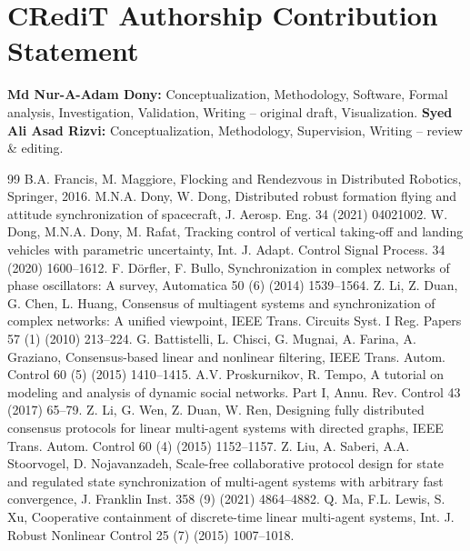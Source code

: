 \documentclass[12pt]{elsarticle}
\theoremstyle{remark}
\begin{document}
\section*{CRediT Authorship Contribution Statement}
\textbf{Md Nur-A-Adam Dony:} Conceptualization, Methodology, Software, Formal analysis, Investigation, Validation, Writing -- original draft, Visualization.
\textbf{Syed Ali Asad Rizvi:} Conceptualization, Methodology, Supervision, Writing -- review \& editing.
\begin{thebibliography}{99}
B.A. Francis, M. Maggiore, Flocking and Rendezvous in Distributed Robotics, Springer, 2016.
M.N.A. Dony, W. Dong, Distributed robust formation flying and attitude synchronization of spacecraft, J. Aerosp. Eng. 34 (2021) 04021002.
W. Dong, M.N.A. Dony, M. Rafat, Tracking control of vertical taking-off and landing vehicles with parametric uncertainty, Int. J. Adapt. Control Signal Process. 34 (2020) 1600--1612.
F. D\"{o}rfler, F. Bullo, Synchronization in complex networks of phase oscillators: A survey, Automatica 50 (6) (2014) 1539--1564.
Z. Li, Z. Duan, G. Chen, L. Huang, Consensus of multiagent systems and synchronization of complex networks: A unified viewpoint, IEEE Trans. Circuits Syst. I Reg. Papers 57 (1) (2010) 213--224.
G. Battistelli, L. Chisci, G. Mugnai, A. Farina, A. Graziano, Consensus-based linear and nonlinear filtering, IEEE Trans. Autom. Control 60 (5) (2015) 1410--1415.
A.V. Proskurnikov, R. Tempo, A tutorial on modeling and analysis of dynamic social networks. Part I, Annu. Rev. Control 43 (2017) 65--79.
Z. Li, G. Wen, Z. Duan, W. Ren, Designing fully distributed consensus protocols for linear multi-agent systems with directed graphs, IEEE Trans. Autom. Control 60 (4) (2015) 1152--1157.
Z. Liu, A. Saberi, A.A. Stoorvogel, D. Nojavanzadeh, Scale-free collaborative protocol design for state and regulated state synchronization of multi-agent systems with arbitrary fast convergence, J. Franklin Inst. 358 (9) (2021) 4864--4882.
Q. Ma, F.L. Lewis, S. Xu, Cooperative containment of discrete-time linear multi-agent systems, Int. J. Robust Nonlinear Control 25 (7) (2015) 1007--1018.

\end{thebibliography}
\end{document}

